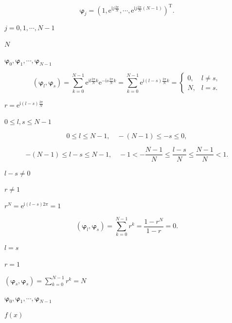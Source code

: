 \documentclass[UTF8,fontset=fandol,a4paper]{ctexart}
\begin{document}
\[
\boldsymbol\varphi_j=\left(1,\mathrm e^{\mathrm ij\frac{2\pi}{N}},\cdots,\mathrm e^{\mathrm ij\frac{2\pi}{N}(N-1)}\right)^{\mathrm T}.
\]

\noindent $j=0,1,\cdots,N-1$\par

\noindent $N$\par

\noindent $\boldsymbol\varphi_0,\boldsymbol\varphi_1,\cdots,\boldsymbol\varphi_{N-1}$\par

\[
(\boldsymbol\varphi_l,\boldsymbol\varphi_s)=\sum_{k=0}^{N-1}\mathrm e^{\mathrm il\frac{2\pi}{N}k}\mathrm e^{-\mathrm is\frac{2\pi}{N}k}=\sum_{k=0}^{N-1}\mathrm e^{\mathrm i(l-s)\frac{2\pi}{N}k}=\begin{cases}0,&l\ne s,\\N,&l=s.\end{cases}\tag{3.7.5}
\]

\noindent $r=\mathrm e^{\mathrm i(l-s)\frac{2\pi}{N}}$\par

\noindent $0\leqslant l,s\leqslant N-1$\par

\[
0\leqslant l\leqslant N-1,\quad-(N-1)\leqslant-s\leqslant0,
\]

\[
-(N-1)\leqslant l-s\leqslant N-1,\quad-1<-\frac{N-1}{N}\leqslant\frac{l-s}{N}\leqslant\frac{N-1}{N}<1.
\]

\noindent $l-s\ne0$\par

\noindent $r\ne1$\par

\noindent $r^N=\mathrm e^{\mathrm i(l-s)2\pi}=1$\par

\[
(\boldsymbol\varphi_l,\boldsymbol\varphi_s)=\sum_{k=0}^{N-1}r^k=\frac{1-r^N}{1-r}=0.
\]

\noindent $l=s$\par

\noindent $r=1$\par

\noindent $(\boldsymbol\varphi_s,\boldsymbol\varphi_s)=\sum_{k=0}^{N-1}r^k=N$\par

\noindent $\boldsymbol\varphi_0,\boldsymbol\varphi_1,\cdots,\boldsymbol\varphi_{N-1}$\par

\noindent $f(x)$\par
\end{document}

